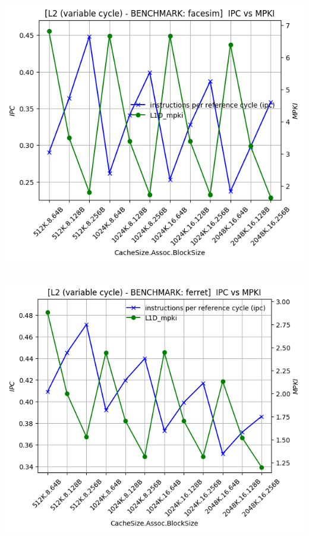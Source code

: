 \begin{minipage}{\textwidth}
    \begin{center}
        \\
        \vspace{3mm}
        \includegraphics[scale=0.65]{graphs/L2/var/facesim.png}
        \vspace{6mm}
    \end{center}
\end{minipage}

\begin{minipage}{\textwidth}
    \begin{center}
        \\
        \vspace{3mm}
        \includegraphics[scale=0.65]{graphs/L2/var/ferret.png}
        \vspace{6mm}
    \end{center}
\end{minipage}


